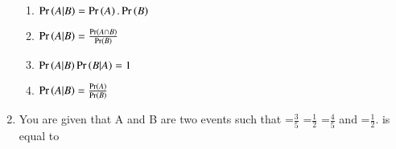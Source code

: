 \begin{enumerate}[label=\thesubsection.\arabic*,ref=\thesubsection.\theenumi]
\begin{multicols}{2}
\begin{enumerate}
	\item $\Pr\left(A|B\right) = \Pr\left(A\right).\Pr\left(B\right)$
	\item $\Pr\left(A|B\right) = \frac{\Pr\left(A\cap B\right)}{\Pr\left(B\right)}$
	\item $\Pr\left(A|B\right)\Pr\left(B|A\right) = 1$
	\item $\Pr\left(A|B\right) = \frac{\Pr\left(A\right)}{\Pr\left(B\right)}$
\end{enumerate}
\end{multicols}
\item You are given that A and B are two events such that =$\frac{3}{5}$ =$\frac{1}{2}$ =$\frac{4}{5}$ and =$\frac{1}{2}$.   is equal to
\end{enumerate}
